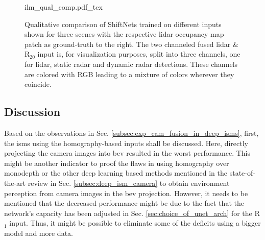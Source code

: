 \begin{figure}[H]
	\begin{center}
		{ilm_qual_comp.pdf_tex}
		\caption{\label{fig:ilm_qual_comp}Qualitative comparison of ShiftNets trained on different inputs shown for three scenes with the respective lidar occupancy map patch as ground-truth to the right. The two channeled fused lidar \& R$_{20}$ input is, for visualization purposes, split into three channels, one for lidar, static radar and dynamic radar detections. These channels are colored with RGB leading to a mixture of colors wherever they coincide.}
	\end{center}
\end{figure}
%
\subsection{Discussion}
\label{subsec:discussion_deep_icm_ilm}
Based on the observations in Sec. \ref{subsec:exp_cam_fusion_in_deep_isms}, first, the \gls{ism}s using the homography-based inputs shall be discussed. Here, directly projecting the camera images into \gls{bev} resulted in the worst performance. This might be another indicator to proof the flaws in using homography over \gls{monodepth} or the other deep learning based methods mentioned in the state-of-the-art review in Sec. \ref{subsec:deep_ism_camera} to obtain environment perception from camera images in the \gls{bev} projection. However, it needs to be mentioned that the decreased performance might be due to the fact that the network's capacity has been adjusted in Sec. \ref{sec:choice_of_unet_arch} for the R$_1$ input. Thus, it might be possible to eliminate some of the deficits using a bigger model and more data. 


